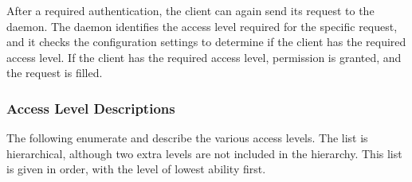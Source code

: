 After a required authentication, the client can again send its
request to the daemon. 
The daemon identifies the access level required for the specific
request,
and it checks the configuration settings to determine if the client 
has the required access level.
If the client has the required access level,
permission is granted, and the request is filled. 

\subsubsection{\label{sec:Security-access-levels} Access Level Descriptions}
The following enumerate and describe the various access levels.
The list is hierarchical, although two extra levels are
not included in the hierarchy.
This list is given in order, with the level of lowest ability first.

